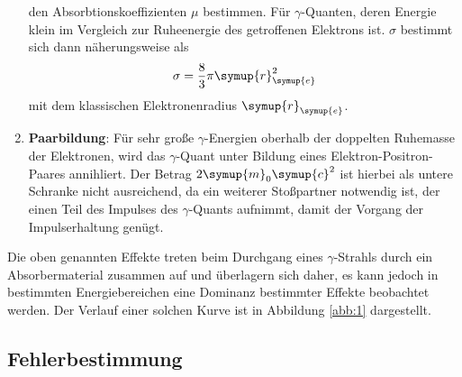 \begin{enumerate}
  den Absorbtionskoeffizienten $\mu$ bestimmen. Für $\gamma$-Quanten, deren
  Energie klein im Vergleich zur Ruheenergie des getroffenen Elektrons ist. $\sigma$ bestimmt sich
  dann näherungsweise als
  \begin{equation}
    \sigma = \frac{8}{3} \pi \symup{r}_{\symup{e}}^2
  \end{equation}
  mit dem klassischen Elektronenradius $\symup{r}_{\symup{e}}$.
  \item \textbf{Paarbildung}: Für sehr große $\gamma$-Energien oberhalb der doppelten
  Ruhemasse der Elektronen, wird das $\gamma$-Quant unter Bildung eines Elektron-Positron-Paares
  annihliert. Der Betrag $2 \symup{m}_0 \symup{c}^2$ ist hierbei als untere Schranke
  nicht ausreichend, da ein weiterer Stoßpartner notwendig ist, der einen Teil des Impulses
  des $\gamma$-Quants aufnimmt, damit der Vorgang der Impulserhaltung genügt.
\end{enumerate}
Die oben genannten Effekte treten beim Durchgang eines $\gamma$-Strahls durch ein
Absorbermaterial zusammen auf und überlagern sich daher, es kann jedoch in bestimmten
Energiebereichen eine Dominanz bestimmter Effekte beobachtet werden. Der Verlauf einer solchen
Kurve ist in Abbildung \ref{abb:1} dargestellt.





\subsection{Fehlerbestimmung}